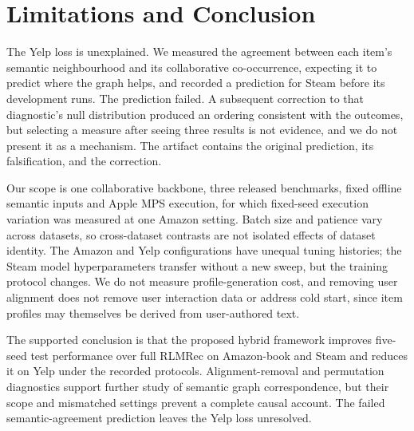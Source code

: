 \documentclass[runningheads]{llncs}
\begin{document}
\begin{table}[t]
\caption{Isomorphic graph permutation: identical topology and degree multiset,
reassigned item labels. Difference is permuted minus real. Settings differ
across rows; the Amazon baseline has incomplete historical protocol metadata.}
\label{tab:permutation}
\centering\small
{}
\end{table}

\section{Limitations and Conclusion}
The Yelp loss is unexplained. We measured the agreement between each item's
semantic neighbourhood and its collaborative co-occurrence, expecting it to
predict where the graph helps, and recorded a prediction for Steam before its development runs. The prediction failed. A subsequent correction to that diagnostic's
null distribution produced an ordering consistent with the outcomes, but
selecting a measure after seeing three results is not evidence, and we do not
present it as a mechanism. The artifact contains the original prediction, its
falsification, and the correction.

Our scope is one collaborative backbone, three released benchmarks, fixed
offline semantic inputs and Apple MPS execution, for which fixed-seed execution variation was measured at one Amazon setting. Batch size and patience vary across datasets, so cross-dataset contrasts
are not isolated effects of dataset identity. The Amazon and Yelp configurations have unequal tuning histories; the Steam model hyperparameters transfer without a new sweep, but
the training protocol changes. We do not
measure profile-generation cost, and removing user alignment does not remove
user interaction data or address cold start, since item profiles may themselves
be derived from user-authored text.

The supported conclusion is that the proposed hybrid framework improves
five-seed test performance over full RLMRec on Amazon-book and Steam and
reduces it on Yelp under the recorded protocols. Alignment-removal and
permutation diagnostics support further study of semantic graph correspondence,
but their scope and mismatched settings prevent a complete causal account.
The failed semantic-agreement prediction leaves the Yelp loss unresolved.
\end{document}
